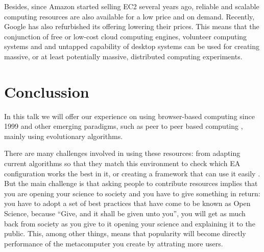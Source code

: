 \documentclass{svmult}
\begin{document}
Besides, since Amazon started selling EC2 several years ago, reliable and scalable computing resources are also available for a low price and on demand. Recently, Google has also refurbished its offering lowering their prices. This means that the conjunction of free or low-cost cloud computing engines, volunteer computing systems and and untapped capability of desktop systems can be used for creating massive, or at least potentially massive, distributed computing experiments.

\section{Conclussion}

In this talk we will offer our experience on using browser-based computing since 1999 \cite{jesusIWANN99} and other emerging paradigms, such as peer to peer based computing \cite{evag:gpem}, mainly using evolutionary algorithms. 

There are many challenges involved in using these resources: from adapting current algorithms so that they match this environment \cite{agajaj} to check which EA configuration works the best in it, or creating a framework that can use it easily \cite{nodeo2014}. But the main challenge is that asking people to contribute resources implies that you are opening your science to society and you have to give something in return: you have to adopt a set of best practices that have come to be known as Open Science, because ``Give, and it shall be given unto you'', you will get as much back from society as you give to it opening your science and explaining it to the public. This, among other things, means that popularity will become directly performance of the metacomputer you create by attrating more users.





\end{document}
